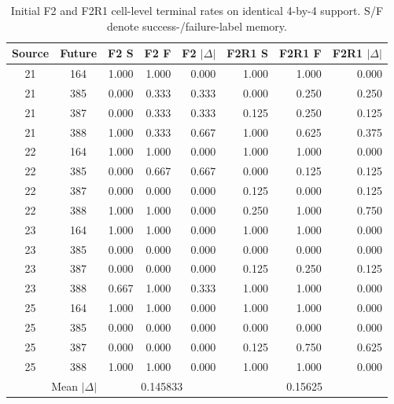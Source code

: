\begin{table}[h]
\centering
\caption{Initial F2 and F2R1 cell-level terminal rates on identical 4-by-4 support. S/F denote success-/failure-label memory.}
\label{tab:f2-f2r1-compare}
\scriptsize
\begin{tabular}{ccrrrrrr}
\toprule
Source & Future & F2 S & F2 F & F2 $|\Delta|$ & F2R1 S & F2R1 F & F2R1 $|\Delta|$ \\
\midrule
21 & 164 & 1.000 & 1.000 & 0.000 & 1.000 & 1.000 & 0.000 \\
21 & 385 & 0.000 & 0.333 & 0.333 & 0.000 & 0.250 & 0.250 \\
21 & 387 & 0.000 & 0.333 & 0.333 & 0.125 & 0.250 & 0.125 \\
21 & 388 & 1.000 & 0.333 & 0.667 & 1.000 & 0.625 & 0.375 \\
22 & 164 & 1.000 & 1.000 & 0.000 & 1.000 & 1.000 & 0.000 \\
22 & 385 & 0.000 & 0.667 & 0.667 & 0.000 & 0.125 & 0.125 \\
22 & 387 & 0.000 & 0.000 & 0.000 & 0.125 & 0.000 & 0.125 \\
22 & 388 & 1.000 & 1.000 & 0.000 & 0.250 & 1.000 & 0.750 \\
23 & 164 & 1.000 & 1.000 & 0.000 & 1.000 & 1.000 & 0.000 \\
23 & 385 & 0.000 & 0.000 & 0.000 & 0.000 & 0.000 & 0.000 \\
23 & 387 & 0.000 & 0.000 & 0.000 & 0.125 & 0.250 & 0.125 \\
23 & 388 & 0.667 & 1.000 & 0.333 & 1.000 & 1.000 & 0.000 \\
25 & 164 & 1.000 & 1.000 & 0.000 & 1.000 & 1.000 & 0.000 \\
25 & 385 & 0.000 & 0.000 & 0.000 & 0.000 & 0.000 & 0.000 \\
25 & 387 & 0.000 & 0.000 & 0.000 & 0.125 & 0.750 & 0.625 \\
25 & 388 & 1.000 & 1.000 & 0.000 & 1.000 & 1.000 & 0.000 \\
\midrule
\multicolumn{2}{r}{Mean $|\Delta|$} & \multicolumn{3}{c}{0.145833} & \multicolumn{3}{c}{0.15625} \\
\bottomrule
\end{tabular}
\end{table}

